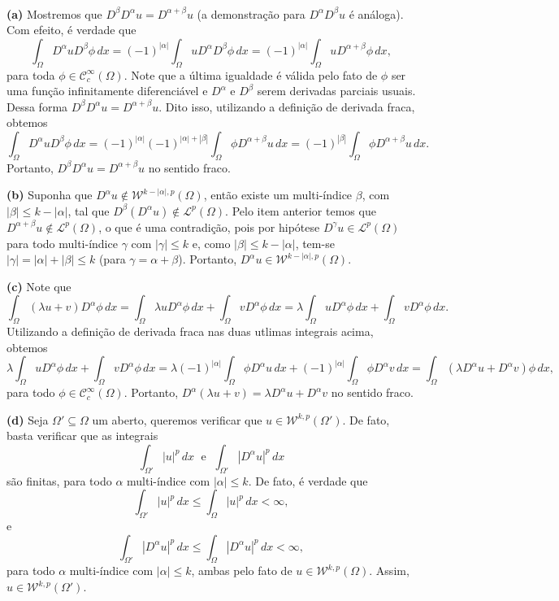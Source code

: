 \documentclass[a4paper, 11pt]{book}
\theoremstyle{definition}
\newcommand{\cC}{\mathcal{C}}
\newcommand{\cL}{\mathcal{L}}
\newcommand{\cW}{\mathcal{W}}
\begin{document}
\begin{prf}
    ~

    \textbf{(a)} Mostremos que $D^{\beta}D^{\alpha} u = D^{\alpha + \beta}u$ (a demonstração para $D^{\alpha}D^{\beta} u$ é análoga).
    Com efeito, é verdade que
    \[
        \int_\Omega D^{\alpha} u D^{\beta} \phi \, dx = (-1)^{|\alpha|} \int_\Omega u D^{\alpha} D^{\beta} \phi \, dx = (-1)^{|\alpha|} \int_\Omega u D^{\alpha + \beta} \phi \,dx,
    \]
    para toda $\phi \in \cC^{\infty}_c(\Omega)$. Note que a última igualdade é válida pelo fato de $\phi$ ser uma função infinitamente diferenciável e $D^\alpha$ e $D^\beta$ serem derivadas parciais usuais.
    Dessa forma $D^{\beta}D^{\alpha} u = D^{\alpha + \beta} u$.
    Dito isso, utilizando a definição de derivada fraca, obtemos
    \[
        \int_\Omega D^{\alpha} u D^{\beta} \phi \, dx = (-1)^{|\alpha|}(-1)^{|\alpha| + |\beta|} \int_\Omega \phi D^{\alpha+\beta} u \,dx = (-1)^{|\beta|} \int_\Omega \phi D^{\alpha + \beta} u \,dx.
    \]
    Portanto, $D^{\beta} D^{\alpha} u = D^{\alpha + \beta} u$ no sentido fraco.

    \textbf{(b)} Suponha que $D^\alpha u \not\in \cW^{k-|\alpha|,p}(\Omega)$, então existe um multi-índice $\beta$, com $|\beta| \leqslant k - |\alpha|$, tal que $D^{\beta}(D^{\alpha}u) \not\in \cL^p(\Omega)$.
    Pelo item anterior temos que $D^{\alpha+\beta}u \not\in \cL^p(\Omega)$, o que é uma contradição, pois por hipótese $D^{\gamma}u \in \cL^p(\Omega)$ para todo multi-índice $\gamma$ com $|\gamma| \leqslant k$ e, como $|\beta| \leqslant k - |\alpha|$, tem-se $|\gamma| = |\alpha| + |\beta| \leqslant k$ (para $\gamma = \alpha + \beta$).
    Portanto, $D^{\alpha}u \in \cW^{k-|\alpha|,p}(\Omega)$.

    \textbf{(c)} Note que
    \[
        \int_\Omega (\lambda u + v) D^{\alpha}\phi \,dx = \int_\Omega \lambda u D^\alpha \phi \, dx + \int_\Omega v D^\alpha \phi \, dx = \lambda \int_\Omega u D^{\alpha} \phi \,dx + \int_\Omega v D^{\alpha} \phi \, dx.
    \]
    Utilizando a definição de derivada fraca nas duas utlimas integrais acima, obtemos
    {\small
    \[
        \lambda \int_\Omega u D^{\alpha} \phi \,dx + \int_\Omega v D^{\alpha} \phi \, dx = \lambda (-1)^{|\alpha|} \int_\Omega \phi D^{\alpha} u \, dx + (-1)^{|\alpha|}\int_\Omega \phi D^{\alpha} v \, dx = \int_\Omega (\lambda D^{\alpha}u + D^{\alpha}v )\phi \,dx,
    \]}\!
    para todo $\phi \in \cC^{\infty}_c(\Omega)$. Portanto, $D^{\alpha}(\lambda u + v) = \lambda D^\alpha u + D^\alpha v$ no sentido fraco.

    \textbf{(d)} Seja $\Omega' \subseteq \Omega$ um aberto, queremos verificar que $u \in \cW^{k,p}(\Omega')$.
    De fato, basta verificar que as integrais
    \[
        \int_{\Omega'} |u|^p \, dx \;\text{ e }\; \int_{\Omega'} |D^{\alpha}u|^p \, dx
    \]
    são finitas, para todo $\alpha$ multi-índice com $|\alpha| \leqslant k$. De fato, é verdade que
    \[
        \int_{\Omega'} |u|^p \, dx \leqslant \int_{\Omega} |u|^p \,dx < \infty,
    \]
    e
    \[
        \int_{\Omega'} |D^\alpha u|^p \, dx \leqslant \int_{\Omega} |D^\alpha u|^p \,dx < \infty,
    \]
    para todo $\alpha$ multi-índice com $|\alpha| \leqslant k$, ambas pelo fato de $u \in \cW^{k,p}(\Omega)$.
    Assim, $u \in \cW^{k,p}(\Omega')$.


\end{prf}
\end{document}
